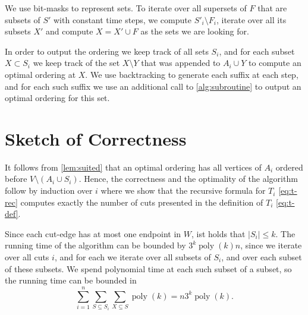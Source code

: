 \documentclass[a4paper,UKenglish,cleveref, autoref, thm-restate]{lipics-v2021}
\begin{document}
We use bit-masks to represent sets. To iterate over all supersets of $F$ that are subsets of $S'$ with constant time steps, we compute $S'_i\setminus F_i$, iterate over all its subsets $X'$ and compute $X = X' \cup F$ as the sets we are looking for.

In order to output the ordering we keep track of all sets $S_i$, and for each subset $X\subset S_i$ we keep track of the set $X\setminus Y$ that was appended to $A_i \cup Y$ to compute an optimal ordering at $X$. We use backtracking to generate each suffix at each step, and for each such suffix we use an additional call to \cref{alg:subroutine} to output an optimal ordering for this set.

\section{Sketch of Correctness}
It follows from \cref{lem:suited} that an optimal ordering has all vertices of $A_i$ ordered before $V\setminus (A_i \cup S_i)$.
Hence, the correctness and the optimality of the algorithm follow by induction over $i$ where we show that the recursive formula for $T_i$ \cref{eq:t-rec} computes exactly the number of cuts presented in the definition of $T_i$ \cref{eq:t-def}.

Since each cut-edge has at most one endpoint in $W$, ist holds that $|S_i|\leq k$.
The running time of the algorithm can be bounded by $3^k \operatorname{poly}(k)n$, since we iterate over all cuts $i$, and for each we iterate over all subsets of $S_i$, and over each subset of these subsets. We spend polynomial time at each such subset of a subset, so the running time can be bounded in 
\[
\sum_{i=1}^{n}\sum\limits_{S\subseteq S_i}\sum\limits_{X\subseteq S} \operatorname{poly}(k) = n3^k\operatorname{poly}(k).
\]

\end{document}
